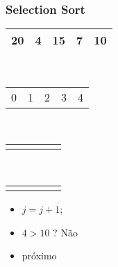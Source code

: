 \documentclass{beamer}
\begin{document}
\begin{frame}
    \frametitle{Selection Sort}
    \begin{center}
        \begin{table}
            \begin{tabular}{| p{0.25cm} | p{0.25cm} | p{0.25cm} | p{0.25cm} | p{0.25cm} |}
                \hline
                20 & 4 & 15 & 7 & 10 \\ \hline
            \end{tabular} \\
            \begin{tabular}{p{0.25cm} p{0.25cm} p{0.25cm} p{0.25cm} p{0.25cm}}
                0 & 1 & 2 & 3 & 4
            \end{tabular} \\
            \begin{tabular}{p{0.25cm} p{0.25cm} p{0.25cm} p{0.25cm} p{0.25cm}}
                \color{blue}{$\uparrow$} & & & & \color{red}{$\uparrow$}
            \end{tabular} \\
            \begin{tabular}{p{0.25cm} p{0.25cm} p{0.25cm} p{0.25cm} p{0.25cm}}
                \color{blue}{i} & & & & \color{red}{j}
            \end{tabular}
        \end{table}
	\end{center}
    \color{green}{$troca = 1$}
    \begin{itemize}[<+->]
        \item $j = j + 1$;
        \item $4 > 10$ ? Não
        \item próximo
    \end{itemize}
\end{frame}
\end{document}
